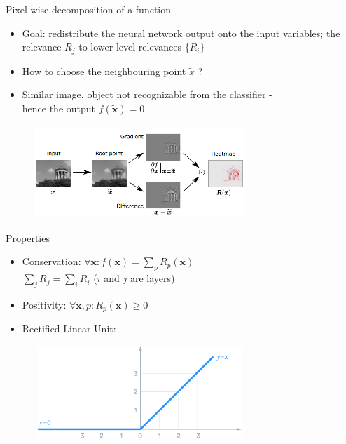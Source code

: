 \documentclass{beamer}
\begin{document}
\begin{frame}{Pixel-wise decomposition of a function}

\begin{itemize}
  \item Goal: redistribute the neural network output onto the input variables; the relevance $R_j$ to lower-level relevances $\{R_i\}$
  \item How to choose the neighbouring point $\tilde{x}$ ?
  \item Similar image, object not recognizable from the classifier - \\
  hence the output $f(\tilde{\mathbf{x}}) = 0$
\end{itemize}

\begin{figure}[ht]
	\centering
    \includegraphics[width=8cm, height=3.5cm]{figures/choose_x}
	\label{fig:ChooseX}
\end{figure}

\end{frame}
\begin{frame}{Properties}

\begin{itemize}
  \item Conservation: $\forall \mathbf{x}: f(\mathbf{x}) = \sum_p R_p(\mathbf{x})$ \\
  $\sum_j R_j = \sum_i R_i$ ($i$ and $j$ are layers)
  \item Positivity: $\forall \mathbf{x}, p: R_p(\mathbf{x}) \geq 0$
\end{itemize}

\vspace{20px}

\begin{itemize}
  \item Rectified Linear Unit:
\end{itemize}
\begin{figure}[ht]
	\centering
    \includegraphics[width=8cm, height=3.5cm]{figures/ReLU}
	\label{fig:ReLU}
\end{figure}

\end{frame}
\end{document}
